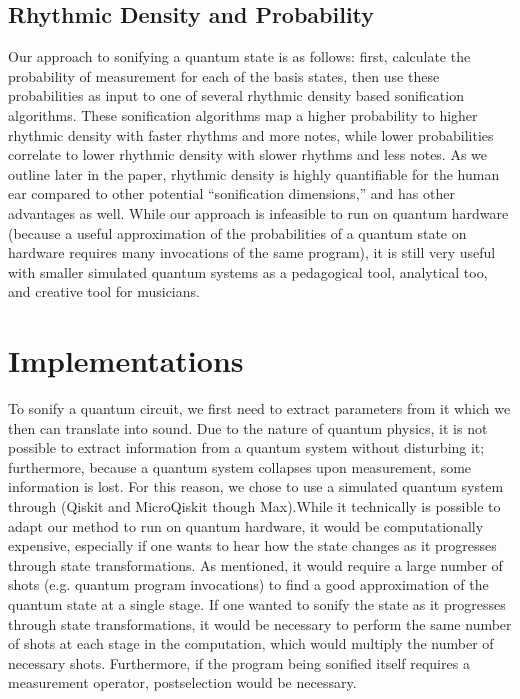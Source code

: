 \documentclass[10pt,twocolumn]{article}
\begin{document}
\subsection{Rhythmic Density and Probability}

Our approach to sonifying a quantum state is as follows: first, calculate the probability of measurement for each of the basis states, then use these probabilities as input to one of several rhythmic density based sonification algorithms. These sonification algorithms map a higher probability to higher rhythmic density with faster rhythms and more notes, while lower probabilities correlate to lower rhythmic density with slower rhythms and less notes. As we outline later in the paper, rhythmic density is highly quantifiable for the human ear compared to other potential “sonification dimensions,” and has other advantages as well. While our approach is infeasible to run on quantum hardware (because a useful approximation of the probabilities of a quantum state on hardware requires many invocations of the same program), it is still very useful with smaller simulated quantum systems as a pedagogical tool, analytical too, and creative tool for musicians.

\section{Implementations}

To sonify a quantum circuit, we first need to extract parameters from it which we then can translate into sound. Due to the nature of quantum physics, it is not possible to extract information from a quantum system without disturbing it; furthermore, because a quantum system collapses upon measurement, some information is lost. For this reason, we chose to use a simulated quantum system through (Qiskit\cite{qiskit} and MicroQiskit\cite{microqiskit} though Max\cite{maxmsp}).While it technically is possible to adapt our method to run on quantum hardware, it would be computationally expensive, especially if one wants to hear how the state changes as it progresses through state transformations. As mentioned, it would require a large number of shots (e.g. quantum program invocations) to find a good approximation of the quantum state at a single stage\cite{qiskitalgos}. If one wanted to sonify the state as it progresses through state transformations, it would be necessary to perform the same number of shots at each stage in the computation, which would multiply the number of necessary shots. Furthermore, if the program being sonified itself requires a measurement operator, postselection would be necessary.
\end{document}
